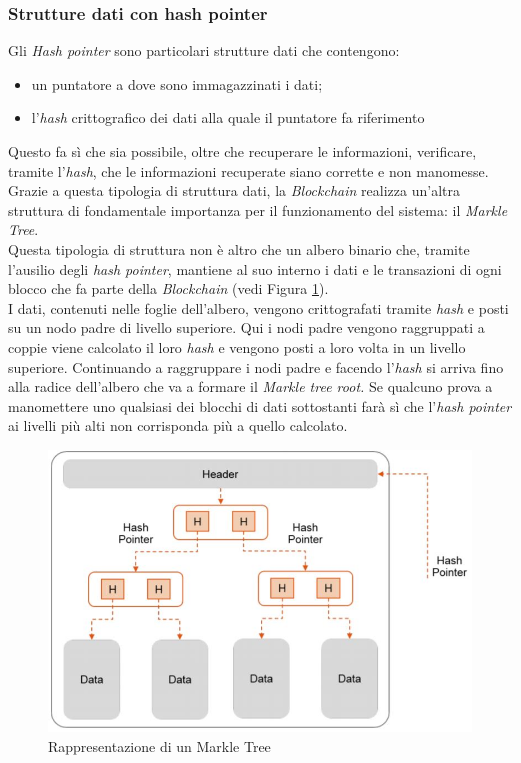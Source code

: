 \subsubsection{Strutture dati con hash pointer}
Gli \textit{Hash pointer} sono particolari strutture dati che contengono:
\begin{itemize}
	\item un puntatore a dove sono immagazzinati i dati;
	\item l'\textit{hash} crittografico dei dati alla quale il puntatore fa riferimento
\end{itemize}
Questo fa sì che sia possibile, oltre che recuperare le informazioni, verificare, tramite l'\textit{hash}, che le informazioni recuperate siano corrette e non manomesse.\\
Grazie a questa tipologia di struttura dati, la \textit{Blockchain} realizza un'altra struttura di fondamentale importanza per il funzionamento del sistema: il \textit{Markle Tree}.\\
Questa tipologia di struttura non è altro che un albero binario che, tramite l'ausilio degli \textit{hash pointer}, mantiene al suo interno i dati e le transazioni di ogni blocco che fa parte della \textit{Blockchain} (vedi Figura \ref{img:markeTree}).\\
I dati, contenuti nelle foglie dell'albero, vengono crittografati tramite \textit{hash} e posti su un nodo padre di livello superiore. Qui i nodi padre vengono raggruppati a coppie viene calcolato il loro \textit{hash} e vengono posti a loro volta in un livello superiore. 
Continuando a raggruppare i nodi padre e facendo l'\textit{hash} si arriva fino alla radice dell'albero che va a formare il \textit{Markle tree root.}
Se qualcuno prova a manomettere uno qualsiasi dei blocchi di dati sottostanti farà sì che l'\textit{hash pointer} ai livelli più alti non corrisponda più a quello calcolato.
\begin{figure}[!h]
	\centering
	\includegraphics[scale=0.50]{immagini/markle_tree}
	\caption{Rappresentazione di un Markle Tree}
	\label{img:markeTree}
\end{figure} 
